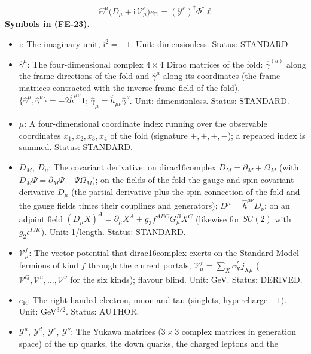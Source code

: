 \documentclass[
  10pt,
]{article}
\providecommand{\tightlist}{%
  \setlength{\itemsep}{0pt}\setlength{\parskip}{0pt}}
\begin{document}
\[
\mathrm{i}\hat\gamma^\mu\big(D_\mu + \mathrm{i}\,\mathcal{V}^{e}_\mu\big)e_{\mathrm{R}} = (\mathcal{Y}^{e})^\dagger\Phi^\dagger\ell \tag{FE-23}
\] \textbf{Symbols in (FE-23).}

\begin{itemize}
\tightlist
\item
  \(\mathrm{i}\): The imaginary unit, \(\mathrm{i}^2 = -1\). Unit:
  dimensionless. Status: STANDARD.
\item
  \(\hat\gamma^\mu\): The four-dimensional complex \(4 \times 4\) Dirac
  matrices of the fold: \(\hat\gamma^{(a)}\) along the frame directions
  of the fold and \(\hat\gamma^\mu\) along its coordinates (the frame
  matrices contracted with the inverse frame field of the fold),
  \(\{\hat\gamma^\mu, \hat\gamma^\nu\} = -2\hat h^{\mu\nu}\mathbf{1}\);
  \(\hat\gamma_\mu = \hat h_{\mu\nu}\hat\gamma^\nu\). Unit:
  dimensionless. Status: STANDARD.
\item
  \(\mu\): A four-dimensional coordinate index running over the
  observable coordinates \(x_1, x_2, x_3, x_4\) of the fold (signature
  \(+,+,+,-\)); a repeated index is summed. Status: STANDARD.
\item
  \(D_M,\ D_\mu\): The covariant derivative: on dirac16complex
  \(D_M = \partial_M + \Omega_M\) (with
  \(D_M\bar\Psi = \partial_M\bar\Psi - \bar\Psi\Omega_M\)); on the
  fields of the fold the gauge and spin covariant derivative \(D_\mu\)
  (the partial derivative plus the spin connection of the fold and the
  gauge fields times their couplings and generators);
  \(D^\mu = \hat h^{\mu\nu}D_\nu\); on an adjoint field
  \((D_\mu X)^A = \partial_\mu X^A + g_3f^{ABC}G^B_\mu X^C\) (likewise
  for \(SU(2)\) with \(g_2\epsilon^{IJK}\)). Unit: 1/length. Status:
  STANDARD.
\item
  \(\mathcal{V}^{f}_\mu\): The vector potential that dirac16complex
  exerts on the Standard-Model fermions of kind \(f\) through the
  current portals, \(\mathcal{V}^{f}_\mu = \sum_Xc^{f}_Xj_{X\mu}\)
  (\(\mathcal{V}^{Q}, \mathcal{V}^{u}, \dots, \mathcal{V}^{\nu}\) for
  the six kinds); flavour blind. Unit: GeV. Status: DERIVED.
\item
  \(e_{\mathrm{R}}\): The right-handed electron, muon and tau (singlets,
  hypercharge \(-1\)). Unit: GeV\(^{3/2}\). Status: AUTHOR.
\item
  \(\mathcal{Y}^{u},\ \mathcal{Y}^{d},\ \mathcal{Y}^{e},\ \mathcal{Y}^{\nu}\):
  The Yukawa matrices (\(3 \times 3\) complex matrices in generation
  space) of the up quarks, the down quarks, the charged leptons and the

\end{itemize}
\end{document}
